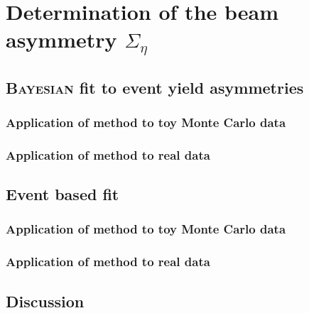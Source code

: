 \chapter{Determination of the beam asymmetry $\Sigma_{\eta}$}

\section{\textsc{Bayesian} fit to event yield asymmetries}
\subsection{Application of method to toy Monte Carlo data}
\subsection{Application of method to real data}

\section{Event based fit}
\subsection{Application of method to toy Monte Carlo data}

\subsection{Application of method to real data}

\section{Discussion}